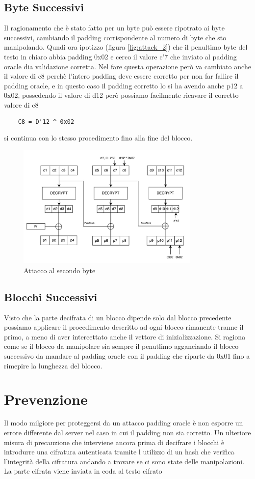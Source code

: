 \subsection{Byte Successivi}
Il ragionamento che è stato fatto per un byte può essere ripotrato ai byte successivi, cambiando il padding corrispondente al numero di byte che sto manipolando.
Qundi  ora ipotizzo (figura \ref{fig:attack_2}) che il penultimo byte del testo in chiaro abbia padding 0x02 e cerco il valore c'7 che inviato al padding oracle dia validazione corretta.
Nel fare questa operazione però va cambiato anche il valore di c8 perchè l'intero padding deve essere corretto per non far fallire il padding oracle, e in questo caso il padding corretto lo 
si ha avendo anche p12 a 0x02, possedendo il valore di d12 però possiamo facilmente ricavare il corretto valore di c8
\begin{verbatim}
    C8 = D'12 ^ 0x02
 \end{verbatim}
 si continua con lo stesso procedimento fino alla fine del blocco.
\begin{figure}[h!]
    \includegraphics[width=0.8\textwidth]{img/attack_second_byte.jpeg}
    \centering
    \caption{Attacco al secondo byte}
    \label{fig:attack_3}
\end{figure}
\subsection{Blocchi Successivi}
Visto che la parte decifrata di un blocco dipende solo dal blocco precedente possiamo applicare il procedimento descritto ad ogni blocco rimanente tranne il primo, a meno di aver intercettato anche il vettore di inizializzazione.
Si ragiona come se il blocco da manipolare sia sempre il penutlimo agganciando il blocco successivo da mandare al padding oracle con il padding che riparte da 0x01 fino a rimepire la lunghezza del blocco.
\section{Prevenzione}
Il modo milgiore per proteggersi da un attacco padding oracle è non esporre un errore differente dal server nel caso in cui il padding non sia corretto.
Un ulteriore misura di precauzione che interviene ancora prima di decifrare i blocchi è introdurre una cifratura autenticata tramite l utilizzo di un hash che verifica l'integrità della cifratura andando a trovare se ci sono state delle manipolazioni. La parte cifrata viene inviata in coda al testo cifrato